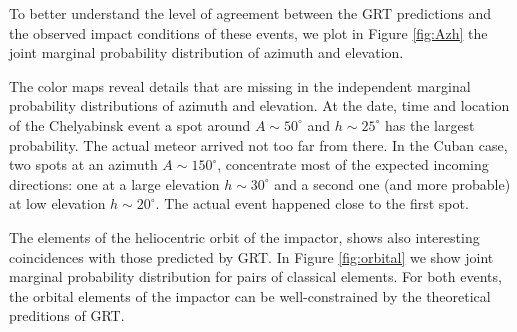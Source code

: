 \documentclass[fleqn,usenatbib]{mnras}
\begin{document}
To better understand the level of agreement between the GRT predictions and the observed impact conditions of these events, we plot in Figure \ref{fig:Azh} the joint marginal probability distribution of azimuth and elevation.  

The color maps reveal details that are missing in the independent marginal  probability distributions of azimuth and elevation.  At the date, time and location of the Chelyabinsk event a spot around $A\sim 50^\circ$ and $h\sim 25^\circ$ has the largest probability.  The actual meteor arrived not too far from there.  In the Cuban case, two spots at an azimuth $A\sim 150^\circ$, concentrate most of the expected incoming directions: one at a large elevation $h\sim 30^\circ$ and a second one (and more probable) at low elevation $h\sim 20^\circ$.  The actual event happened close to the first spot.

The elements of the heliocentric orbit of the impactor, shows also interesting coincidences with those predicted by GRT.  In Figure \ref{fig:orbital} we show joint marginal probability distribution for pairs of classical elements. For both events, the orbital elements of the impactor can be well-constrained by the theoretical preditions of GRT. 
\end{document}
